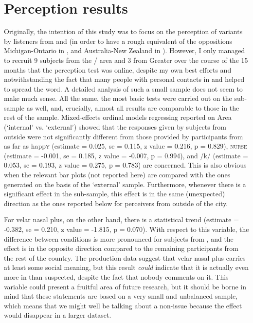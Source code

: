 \chapter{Perception results}
\label{ch.perc_res}

Originally, the intention of this study was to focus on the perception of  variants by listeners from  and  (in order to have a rough equivalent of the oppositions Michigan-Ontario in \citealt{niedzielski1999}, and Australia-New Zealand in \citealt{hayetal2006a}).
However, I only managed to recruit 9 subjects from the / area and 3 from Greater  over the course of the 15 months that the perception test was online, despite my own best efforts and notwithstanding the fact that many people with personal contacts in  and  helped to spread the word.
A detailed analysis of such a small sample does not seem to make much sense.
All the same, the most basic tests were carried out on the  sub-sample as well, and, crucially, almost all results are comparable to those in the rest of the sample.
Mixed-effects ordinal models regressing reported  on Area (\enquote*{internal} vs. \enquote*{external}) showed that the responses given by subjects from outside were not significantly different from those provided by participants from  as far as happ\textsc{y} (estimate = 0.025, se = 0.115, z value = 0.216, p = 0.829), \textsc{nurse} (estimate = -0.001, se = 0.185, z value = -0.007, p = 0.994), and /k/ (estimate = 0.053, se = 0.193, z value = 0.275, p = 0.783) are concerned.
This is also obvious when the relevant bar plots (not reported here) are compared with the ones generated on the basis of the `external' sample.
Furthermore, whenever there is a significant  effect in the  sub-sample, this effect is in the same (unexpected) direction as the ones reported below for perceivers from outside of the city.

For velar nasal plus, on the other hand, there is a statistical trend (estimate = -0.382, se = 0.210, z value = -1.815, p = 0.070).
With respect to this variable, the difference between  conditions is more pronounced for subjects from , and the effect is in the opposite direction compared to the remaining participants from the rest of the country.
The production data suggest that velar nasal plus carries at least some social meaning, but this result \emph{could} indicate that it is actually even more  in  than suspected, despite the fact that nobody comments on it.
This variable could present a fruitful area of future research, but it should be borne in mind that these statements are based on a very small and unbalanced sample, which means that we might well be talking about a non-issue because the effect would disappear in a larger dataset.


